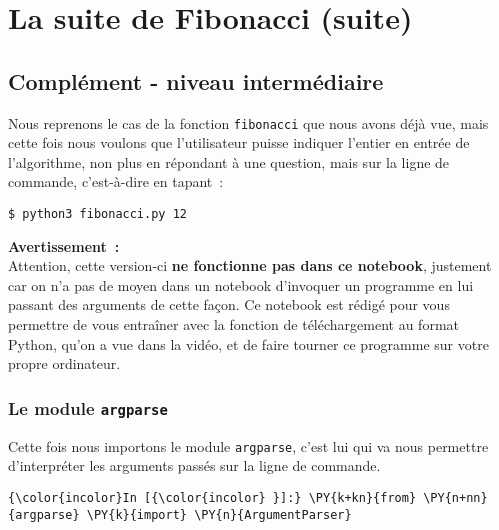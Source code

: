     \hypertarget{la-suite-de-fibonacci-suite}{%
\section{La suite de Fibonacci
(suite)}\label{la-suite-de-fibonacci-suite}}

    \hypertarget{compluxe9ment---niveau-intermuxe9diaire}{%
\subsection{Complément - niveau
intermédiaire}\label{compluxe9ment---niveau-intermuxe9diaire}}

    Nous reprenons le cas de la fonction \texttt{fibonacci} que nous avons
déjà vue, mais cette fois nous voulons que l'utilisateur puisse indiquer
l'entier en entrée de l'algorithme, non plus en répondant à une
question, mais sur la ligne de commande, c'est-à-dire en tapant~:

\begin{verbatim}
$ python3 fibonacci.py 12
\end{verbatim}

    \textbf{Avertissement~:}\\

Attention, cette version-ci \textbf{ne fonctionne pas dans ce notebook},
justement car on n'a pas de moyen dans un notebook d'invoquer un
programme en lui passant des arguments de cette façon. Ce notebook est
rédigé pour vous permettre de vous entraîner avec la fonction de
téléchargement au format Python, qu'on a vue dans la vidéo, et de faire
tourner ce programme sur votre propre ordinateur.

    \hypertarget{le-module-argparse}{%
\subsubsection{\texorpdfstring{Le module
\texttt{argparse}}{Le module argparse}}\label{le-module-argparse}}

    Cette fois nous importons le module \texttt{argparse}, c'est lui qui va
nous permettre d'interpréter les arguments passés sur la ligne de
commande.

    \begin{Verbatim}[commandchars=\\\{\}]
{\color{incolor}In [{\color{incolor} }]:} \PY{k+kn}{from} \PY{n+nn}{argparse} \PY{k}{import} \PY{n}{ArgumentParser}
\end{Verbatim}


